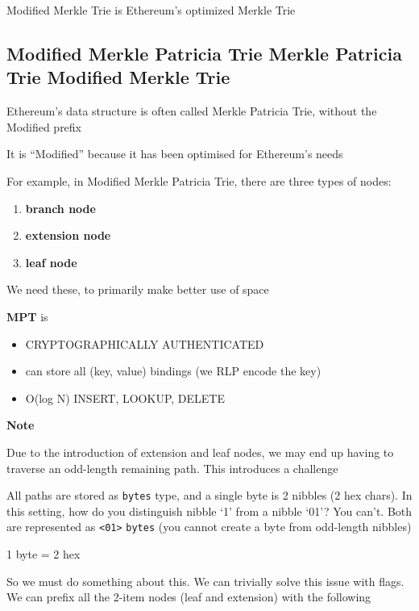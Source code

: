 \documentclass[11pt]{article}
\begin{document}
    Modified Merkle Trie is Ethereum's optimized Merkle Trie

    \hypertarget{modified-merkle-patricia-trie-merkle-patricia-trie-modified-merkle-trie}{%
\subsection{Modified Merkle Patricia Trie \textbar{} Merkle Patricia
Trie \textbar{} Modified Merkle
Trie}\label{modified-merkle-patricia-trie-merkle-patricia-trie-modified-merkle-trie}}

    Ethereum's data structure is often called Merkle Patricia Trie, without
the Modified prefix

It is ``Modified'' because it has been optimised for Ethereum's needs

For example, in Modified Merkle Patricia Trie, there are three types of
nodes:

\begin{enumerate}
\def\labelenumi{(\roman{enumi})}
\item
  \textbf{branch node}
\item
  \textbf{extension node}
\item
  \textbf{leaf node}
\end{enumerate}

We need these, to primarily make better use of space

    \textbf{MPT} is

\begin{itemize}
\item
  CRYPTOGRAPHICALLY AUTHENTICATED
\item
  can store all (key, value) bindings (we RLP encode the key)
\item
  O(log N) INSERT, LOOKUP, DELETE
\end{itemize}

    \textbf{Note}

Due to the introduction of extension and leaf nodes, we may end up
having to traverse an odd-length remaining path. This introduces a
challenge

    All paths are stored as \texttt{bytes} type, and a single byte is 2
nibbles (2 hex chars). In this setting, how do you distinguish nibble
`1' from a nibble `01'? You can't. Both are represented as
\texttt{\textless{}01\textgreater{}} \texttt{bytes} (you cannot create a
byte from odd-length nibbles)

1 byte = 2 hex

So we must do something about this. We can trivially solve this issue
with flags. We can prefix all the 2-item nodes (leaf and extension) with
the following
\end{document}

